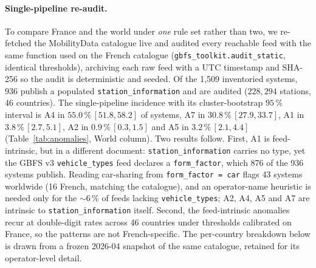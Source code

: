 \documentclass[11pt,a4paper]{article}
\begin{document}
\paragraph{Single-pipeline re-audit.} To compare France and the world under
\emph{one} rule set rather than two, we re-fetched the MobilityData
catalogue live and audited every reachable feed with the same function used
on the French catalogue (\texttt{gbfs\_toolkit.audit\_static}, identical
thresholds), archiving each raw feed with a UTC timestamp and SHA-256 so the
audit is deterministic and seeded. Of the 1{,}509 inventoried systems, 936
publish a populated \texttt{station\_information} and are audited
($228{,}294$ stations, 46 countries). The single-pipeline incidence with its
cluster-bootstrap $95\,\%$ interval is A4 in $55.0\,\%\,[51.8, 58.2]$ of
systems, A7 in $30.8\,\%\,[27.9, 33.7]$, A1 in $3.8\,\%\,[2.7, 5.1]$, A2 in
$0.9\,\%\,[0.3, 1.5]$ and A5 in $3.2\,\%\,[2.1, 4.4]$
(Table~\ref{tab:anomalies}, World column). Two results follow. First, A1 is feed-intrinsic,
but in a different document: \texttt{station\_information} carries no type,
yet the GBFS v3 \texttt{vehicle\_types} feed declares a \texttt{form\_factor},
which 876 of the 936 systems publish. Reading car-sharing from
\texttt{form\_factor = car} flags 43 systems worldwide (16 French, matching
the catalogue), and an operator-name heuristic is needed only for the
$\sim 6\,\%$ of feeds lacking \texttt{vehicle\_types}; A2, A4, A5 and A7 are
intrinsic to \texttt{station\_information} itself. Second, the
feed-intrinsic anomalies recur at double-digit rates across 46 countries
under thresholds calibrated on France, so the patterns are not
French-specific. The per-country breakdown below is drawn from a frozen
2026-04 snapshot of the same catalogue, retained for its operator-level
detail.
\end{document}

